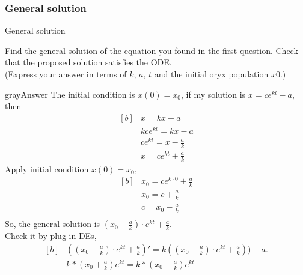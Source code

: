 \subsubsection{General solution}
\begin{problem}
  General solution
\end{problem}
Find the general solution of the equation you found in the first question. Check that the proposed solution satisfies the ODE.\\

(Express your answer in terms of $k$, $a$, $t$ and the initial oryx population $x0$.)
\begin{mybox}{gray}{Answer}
  The initial condition is $x(0) = x_0$,
  if my solution is $ x = ce^{kt} - a$, then
  \begin{equation*}
    \begin{aligned}[b]
      &\displaystyle \dot{x} = kx - a \\
      &\displaystyle kce^{kt} = kx - a \\
      &\displaystyle ce^{kt} = x - \frac{a}{k}  \\
      &\displaystyle x = ce^{kt} + \frac{a}{k} 
    \end{aligned}
  \end{equation*}
  Apply initial condition $x(0) = x_0$,
  \begin{equation*}
    \begin{aligned}[b]
      &\displaystyle x_0 = ce^{k\cdot 0} + \frac{a}{k} \\
      &\displaystyle x_0 = c + \frac{a}{k} \\
      &\displaystyle c  = x_0 - \frac{a}{k} \\
    \end{aligned}
  \end{equation*}
  So, the general solution is $\displaystyle (x_0 - \frac{a}{k})\cdot e^{kt} + \frac{a}{k}$. \\ 
  Check it by plug in DEs,
  \begin{equation*}
    \begin{aligned}[b]
      &\displaystyle ((x_0 - \frac{a}{k})\cdot e^{kt} + \frac{a}{k})'
      = k((x_0 - \frac{a}{k})\cdot e^{kt} + \frac{a}{k})) - a.\\
      &\displaystyle k*(x_0 + \frac{a}{k})e^{kt} = k*(x_0 + \frac{a}{k})e^{kt}
    \end{aligned}
  \end{equation*}
\end{mybox}

